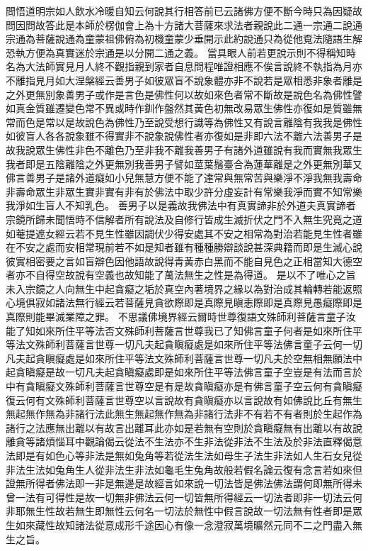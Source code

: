問悟道明宗如人飲水冷暖自知云何說其行相答前已云諸佛方便不斷今時只為因疑故問因問故答此是本師於楞伽會上為十方諸大菩薩來求法者親說此二通一宗通二說通宗通為菩薩說通為童蒙祖佛俯為初機童蒙少垂開示此約說通只為從他覔法隨語生解恐執方便為真實迷於宗通是以分開二通之義。
當具眼人前若更說示則不得稱知時名為大法師實見月人終不觀指親到家者自息問程唯證相應不俟言說終不執指為月亦不離指見月如大涅槃經云善男子如彼眾盲不說象體亦非不說若是眾相悉非象者離是之外更無別象善男子或作是言色是佛性何以故如來色者常不斷故是說色名為佛性譬如真金質雖遷變色常不異或時作釧作盤然其黃色初無改易眾生佛性亦復如是質雖無常而色是常以是故說色為佛性乃至說受想行識等為佛性又有說言離陰有我我是佛性如彼盲人各各說象雖不得實非不說象說佛性者亦復如是非即六法不離六法善男子是故我說眾生佛性非色不離色乃至非我不離我善男子有諸外道雖說有我而實無我眾生我者即是五陰離陰之外更無別我善男子譬如莖葉鬚臺合為蓮華離是之外更無別華又佛言善男子是諸外道癡如小兒無慧方便不能了達常與無常苦與樂淨不淨我無我壽命非壽命眾生非眾生實非實有非有於佛法中取少許分虛妄計有常樂我淨而實不知常樂我淨如生盲人不知乳色。
善男子以是義故我佛法中有真實諦非於外道夫真實諦者宗鏡所歸未聞悟時不信解者所有說法及自修行皆成生滅折伏之門不入無生究竟之道如菴提遮女經云若不見生性雖因調伏少得安處其不安之相常為對治若能見生性者雖在不安之處而安相常現前若不如是知者雖有種種勝辯談說甚深典籍而即是生滅心說彼實相密要之言如盲辯色因他語故說得青黃赤白黑而不能自見色之正相當知大德空者亦不自得空故說有空義也故知能了萬法無生之性是為得道。
是以不了唯心之旨未入宗鏡之人向無生中起貪癡之垢於真空內著境界之緣以為對治成其輪轉若能返照心境俱寂如諸法無行經云若菩薩見貪欲際即是真際見瞋恚際即是真際見愚癡際即是真際則能畢滅業障之罪。
不思議佛境界經云爾時世尊復語文殊師利菩薩言童子汝能了知如來所住平等法否文殊師利菩薩言世尊我已了知佛言童子何者是如來所住平等法文殊師利菩薩言世尊一切凡夫起貪瞋癡處是如來所住平等法佛言童子云何一切凡夫起貪瞋癡處是如來所住平等法文殊師利菩薩言世尊一切凡夫於空無相無願法中起貪瞋癡是故一切凡夫起貪瞋癡處即是如來所住平等法佛言童子空豈是有法而言於中有貪瞋癡文殊師利菩薩言世尊空是有是故貪瞋癡亦是有佛言童子空云何有貪瞋癡復云何有文殊師利菩薩言世尊空以言說故有貪瞋癡亦以言說故有如佛說比丘有無生無起無作無為非諸行法此無生無起無作無為非諸行法非不有若不有者則於生起作為諸行之法應無出離以有故言出離耳此亦如是若無有空則於貪瞋癡無有出離以有故說離貪等諸煩惱耳中觀論偈云從法不生法亦不生非法從非法不生法及於非法直釋偈意法即是有如色心等非法是無如兔角等若從法生法如母生子法生非法如人生石女兒從非法生法如兔角生人從非法生非法如龜毛生兔角故般若假名論云復有念言若如來但證無所得者佛法即一非是無邊是故經言如來說一切法皆是佛法佛法謂何即無所得未曾一法有可得性是故一切無非佛法云何一切皆無所得經云一切法者即非一切法云何非耶無生性故若無生即無性云何名一切法於無性中假言說故一切法無有性者即是眾生如來藏性故知諸法從意成形千途因心有像一念澄寂萬境曠然元同不二之門盡入無生之旨。
